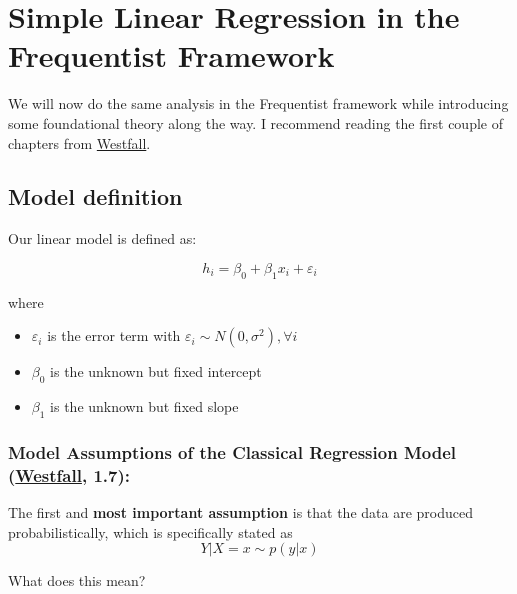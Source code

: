 \documentclass[
]{book}
\providecommand{\tightlist}{%
  \setlength{\itemsep}{0pt}\setlength{\parskip}{0pt}}
\begin{document}
\section{Simple Linear Regression in the Frequentist Framework}\label{simple-linear-regression-in-the-frequentist-framework}

We will now do the same analysis in the Frequentist framework while introducing
some foundational theory along the way.
I recommend reading the first couple of chapters from \href{https://www.routledge.com/Understanding-Regression-Analysis-A-Conditional-Distribution-Approach/Westfall-Arias/p/book/9780367493516?srsltid=AfmBOore3O_Ciecl0TTkr9AjPIY1d6OmbQa7o7IAdKpTSkD8s9HkwzD4}{Westfall}.

\subsection{Model definition}\label{model-definition-1}

Our linear model is defined as:

\[h_i = \beta_0 + \beta_1 x_i + \varepsilon_i\]

where

\begin{itemize}
\tightlist
\item
  \(\varepsilon_i\) is the error term with \(\varepsilon_i \sim N(0, \sigma^2), \forall i\)
\item
  \(\beta_0\) is the unknown but fixed intercept
\item
  \(\beta_1\) is the unknown but fixed slope
\end{itemize}

\subsubsection{\texorpdfstring{Model Assumptions of the Classical Regression Model (\href{https://www.routledge.com/Understanding-Regression-Analysis-A-Conditional-Distribution-Approach/Westfall-Arias/p/book/9780367493516?srsltid=AfmBOore3O_Ciecl0TTkr9AjPIY1d6OmbQa7o7IAdKpTSkD8s9HkwzD4}{Westfall}, 1.7):}{Model Assumptions of the Classical Regression Model (Westfall, 1.7):}}\label{_model_assumptions}

The first and \textbf{most important assumption} is that the data are produced\\
probabilistically, which is specifically stated as
\[Y|X = x \sim p(y|x)\]

What does this mean?
\end{document}
